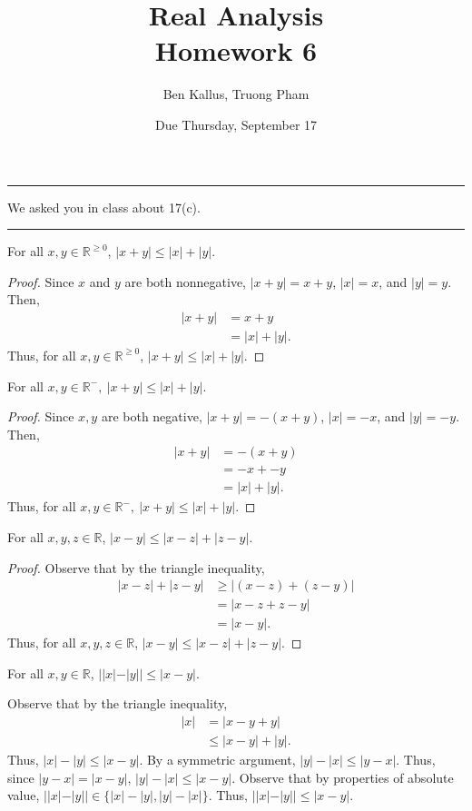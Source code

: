 \documentclass[12pt]{article}
\title{Real Analysis \\ Homework 6}
\author{Ben Kallus, Truong Pham}
\date{Due Thursday, September 17}
\begin{document}
\maketitle

\hrule
\bigskip

 We asked you in class about 17(c). 

\bigskip
\hrule
\bigskip


 For all $x,y \in \mathbb R^{\geq0}$, $|x+y|\leq|x|+|y|$.
\begin{proof}
    Since $x$ and $y$ are both nonnegative, $|x+y| = x+y$, $|x| = x$, and $|y| = y$. Then,
    \begin{align*}
        |x+y| &= x + y \\
              &= |x| + |y|.
    \end{align*}
    Thus, for all $x, y \in \mathbb R^{\geq0}$, $|x+y| \leq |x| + |y|$.
\end{proof}

 For all $x,y \in \mathbb R^-,~|x+y|\leq|x|+|y|$.
\begin{proof}
    Since $x, y$ are both negative, $|x+y| = -(x + y)$, $|x| = -x$, and $|y| = -y$. Then,
    \begin{align*}
        |x+y| &= -(x + y) \\
              &= -x + -y \\
              &= |x| + |y|.
    \end{align*}
    Thus, for all $x,y \in \mathbb R^-,~|x+y|\leq|x|+|y|$.
\end{proof}

\newpage
{} For all $x,y,z \in \mathbb R$, $|x-y| \leq |x - z| + |z - y|$.
\begin{proof}
Observe that by the triangle inequality, \begin{align*}
    |x - z| + |z - y| &\geq |(x-z) + (z-y)| \\
                      &=    |x - z + z - y| \\
                      &=    |x - y|.
\end{align*}
Thus, for all $x,y,z \in \mathbb R$, $|x-y| \leq |x - z| + |z - y|$.
\end{proof}

\newpage
{} For all $x,y \in \mathbb R$, $||x|-|y|| \leq |x-y|$.

    Observe that by the triangle inequality, \begin{align*}
        |x| &= |x - y + y| \\
            &\leq |x - y| + |y|.
    \end{align*}
    Thus, $|x| - |y| \leq |x - y|$. By a symmetric argument, $|y| - |x| \leq |y - x|$. Thus, since $|y - x| = |x - y|$, $|y| - |x| \leq |x - y|$. Observe that by properties of absolute value, $||x| - |y|| \in \{|x| - |y|, |y| - |x|\}$. Thus, $||x| - |y|| \leq |x - y|$.
\end{document}
